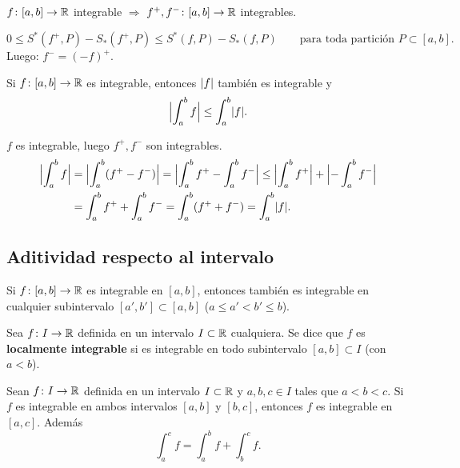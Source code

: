 \documentclass[11pt,a4paper]{article}
\begin{document}
\begin{lema}
$f\colon[a,b]\to\R$ integrable $\Rightarrow$ $f^+,f^-\colon[a,b]\to\R$ integrables.
\end{lema}

\begin{idea}
\[
  0\le S^*(f^+,P)-S_*(f^+,P)\le S^*(f,P)-S_*(f,P)\qquad\text{para toda partición } P\subset[a,b].
\]
Luego: $f^-=(-f)^+$.
\end{idea}

\begin{proposicion}
Si $f\colon[a,b]\to\R$ es integrable, entonces $\abs{f}$ también es integrable y
\[
  \abs[\Big]{\int_a^b f}\le\int_a^b\abs{f}.
\]
\end{proposicion}

\begin{demo}
$f$ es integrable, luego $f^+,f^-$ son integrables.
\begin{align*}
  \abs[\Big]{\int_a^b f} &= \abs[\Big]{\int_a^b(f^+-f^-)} = \abs[\Big]{\int_a^b f^+-\int_a^b f^-}
  \le\abs[\Big]{\int_a^b f^+}+\abs[\Big]{-\int_a^b f^-}\\
  &= \int_a^b f^++\int_a^b f^- = \int_a^b(f^++f^-) = \int_a^b\abs{f}.
\end{align*}
\end{demo}

\subsection{Aditividad respecto al intervalo}

\begin{proposicion}
Si $f\colon[a,b]\to\R$ es integrable en $[a,b]$, entonces también es integrable en cualquier subintervalo $[a',b']\subset[a,b]$ ($a\le a'<b'\le b$).
\end{proposicion}

\begin{definicion}
Sea $f\colon I\to\R$ definida en un intervalo $I\subset\R$ cualquiera. Se dice que $f$ es \textbf{localmente integrable} si es integrable en todo subintervalo $[a,b]\subset I$ (con $a<b$).
\end{definicion}

\begin{proposicion}
Sean $f\colon I\to\R$ definida en un intervalo $I\subset\R$ y $a,b,c\in I$ tales que $a<b<c$. Si $f$ es integrable en ambos intervalos $[a,b]$ y $[b,c]$, entonces $f$ es integrable en $[a,c]$. Además
\[
  \int_a^c f=\int_a^b f+\int_b^c f.
\]
\end{proposicion}
\end{document}
